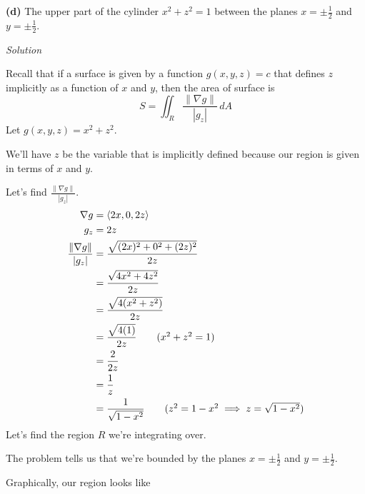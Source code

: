 \documentclass{article}
\newcommand{\lra}[1]{\left\langle #1 \right\rangle}
\newcommand{\norm}[1]{\left\lVert #1 \right\rVert}
\newcommand{\Solution}{\textit{Solution}}
\begin{document}
{}\textbf{(d)} The upper part of the cylinder $x^2+z^2=1$ between the planes $x=\pm\frac{1}{2}$ and $y=\pm\frac{1}{2}$.

\Solution

Recall that if a surface is given by a function $g(x,y,z)=c$ that defines $z$ implicitly as a function of $x$ and $y$, then the area of surface is
\begin{equation*}
    S=\iint_R \frac{\norm{\nabla g}}{\left| g_z\right|}\,dA
\end{equation*}
Let $g(x,y,z)=x^2+z^2$. 

We'll have $z$ be the variable that is implicitly defined because our region is given in terms of $x$ and $y$.

Let's find $\displaystyle\frac{\norm{\nabla g}}{\left| g_z\right|} $.
\begin{align*}
    \nabla g &=\lra{2x,0,2z}\\
    g_z&= 2z\\
    \frac{\norm{\nabla g}}{\left|g_z\right|}&=\frac{\sqrt{(2x)^2+0^2+(2z)^2}}{2z}\\
    &=\frac{\sqrt{4x^2+4z^2}}{2z}\\
    &=\frac{\sqrt{4(x^2+z^2)}}{2z}\\
    &=\frac{\sqrt{4(1)}}{2z}\tag{$x^2+z^2=1$}\\
    &=\frac{2}{2z}\\
    &=\frac{1}{z}\\
    &=\frac{1}{\sqrt{1-x^2}}\tag{$z^2=1-x^2\implies z=\sqrt{1-x^2}$}
\end{align*}
Let's find the region $R$ we're integrating over.

The problem tells us that we're bounded by the planes $x=\pm\frac{1}{2}$ and $y=\pm\frac{1}{2}$.

Graphically, our region looks like \begin{center}
\end{center}
\end{document}
